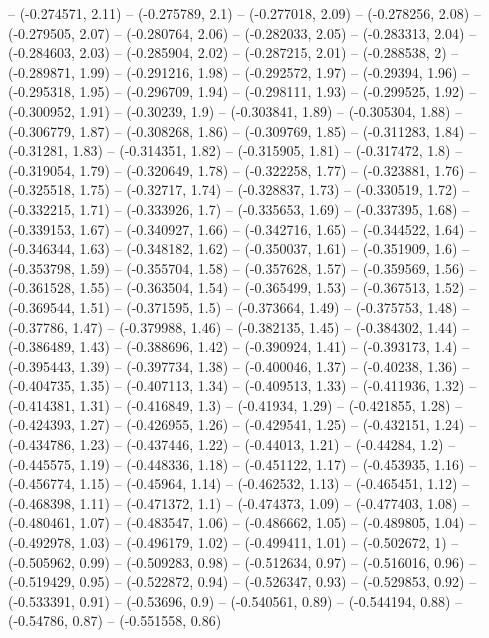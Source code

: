 -- (-0.274571, 2.11)
-- (-0.275789, 2.1)
-- (-0.277018, 2.09)
-- (-0.278256, 2.08)
-- (-0.279505, 2.07)
-- (-0.280764, 2.06)
-- (-0.282033, 2.05)
-- (-0.283313, 2.04)
-- (-0.284603, 2.03)
-- (-0.285904, 2.02)
-- (-0.287215, 2.01)
-- (-0.288538, 2)
-- (-0.289871, 1.99)
-- (-0.291216, 1.98)
-- (-0.292572, 1.97)
-- (-0.29394, 1.96)
-- (-0.295318, 1.95)
-- (-0.296709, 1.94)
-- (-0.298111, 1.93)
-- (-0.299525, 1.92)
-- (-0.300952, 1.91)
-- (-0.30239, 1.9)
-- (-0.303841, 1.89)
-- (-0.305304, 1.88)
-- (-0.306779, 1.87)
-- (-0.308268, 1.86)
-- (-0.309769, 1.85)
-- (-0.311283, 1.84)
-- (-0.31281, 1.83)
-- (-0.314351, 1.82)
-- (-0.315905, 1.81)
-- (-0.317472, 1.8)
-- (-0.319054, 1.79)
-- (-0.320649, 1.78)
-- (-0.322258, 1.77)
-- (-0.323881, 1.76)
-- (-0.325518, 1.75)
-- (-0.32717, 1.74)
-- (-0.328837, 1.73)
-- (-0.330519, 1.72)
-- (-0.332215, 1.71)
-- (-0.333926, 1.7)
-- (-0.335653, 1.69)
-- (-0.337395, 1.68)
-- (-0.339153, 1.67)
-- (-0.340927, 1.66)
-- (-0.342716, 1.65)
-- (-0.344522, 1.64)
-- (-0.346344, 1.63)
-- (-0.348182, 1.62)
-- (-0.350037, 1.61)
-- (-0.351909, 1.6)
-- (-0.353798, 1.59)
-- (-0.355704, 1.58)
-- (-0.357628, 1.57)
-- (-0.359569, 1.56)
-- (-0.361528, 1.55)
-- (-0.363504, 1.54)
-- (-0.365499, 1.53)
-- (-0.367513, 1.52)
-- (-0.369544, 1.51)
-- (-0.371595, 1.5)
-- (-0.373664, 1.49)
-- (-0.375753, 1.48)
-- (-0.37786, 1.47)
-- (-0.379988, 1.46)
-- (-0.382135, 1.45)
-- (-0.384302, 1.44)
-- (-0.386489, 1.43)
-- (-0.388696, 1.42)
-- (-0.390924, 1.41)
-- (-0.393173, 1.4)
-- (-0.395443, 1.39)
-- (-0.397734, 1.38)
-- (-0.400046, 1.37)
-- (-0.40238, 1.36)
-- (-0.404735, 1.35)
-- (-0.407113, 1.34)
-- (-0.409513, 1.33)
-- (-0.411936, 1.32)
-- (-0.414381, 1.31)
-- (-0.416849, 1.3)
-- (-0.41934, 1.29)
-- (-0.421855, 1.28)
-- (-0.424393, 1.27)
-- (-0.426955, 1.26)
-- (-0.429541, 1.25)
-- (-0.432151, 1.24)
-- (-0.434786, 1.23)
-- (-0.437446, 1.22)
-- (-0.44013, 1.21)
-- (-0.44284, 1.2)
-- (-0.445575, 1.19)
-- (-0.448336, 1.18)
-- (-0.451122, 1.17)
-- (-0.453935, 1.16)
-- (-0.456774, 1.15)
-- (-0.45964, 1.14)
-- (-0.462532, 1.13)
-- (-0.465451, 1.12)
-- (-0.468398, 1.11)
-- (-0.471372, 1.1)
-- (-0.474373, 1.09)
-- (-0.477403, 1.08)
-- (-0.480461, 1.07)
-- (-0.483547, 1.06)
-- (-0.486662, 1.05)
-- (-0.489805, 1.04)
-- (-0.492978, 1.03)
-- (-0.496179, 1.02)
-- (-0.499411, 1.01)
-- (-0.502672, 1)
-- (-0.505962, 0.99)
-- (-0.509283, 0.98)
-- (-0.512634, 0.97)
-- (-0.516016, 0.96)
-- (-0.519429, 0.95)
-- (-0.522872, 0.94)
-- (-0.526347, 0.93)
-- (-0.529853, 0.92)
-- (-0.533391, 0.91)
-- (-0.53696, 0.9)
-- (-0.540561, 0.89)
-- (-0.544194, 0.88)
-- (-0.54786, 0.87)
-- (-0.551558, 0.86)
